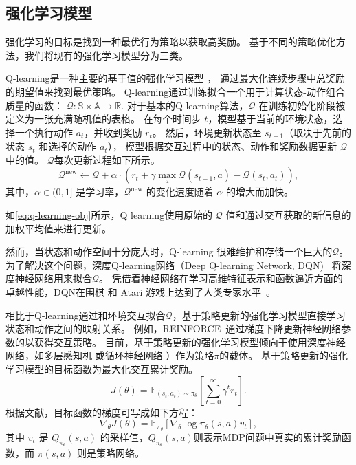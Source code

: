\subsection{强化学习模型}
\label{sec:Deep Reinforcement Learning model}
强化学习的目标是找到一种最优行为策略以获取高奖励。
基于不同的策略优化方法，我们将现有的强化学习模型分为三类。

Q-learning是一种主要的基于值的强化学习模型 \cite{watkins1989learning}，
通过最大化连续步骤中总奖励的期望值来找到最优策略。
Q-learning通过训练拟合一个用于计算状态-动作组合质量的函数：
$
\mathcal{Q}: \mathbb{S} \times \mathbb{A} \rightarrow \mathbb{R}.
$
对于基本的Q-learning算法，$\mathcal{Q}$ 在训练初始化阶段被定义为一张充满随机值的表格。
在每个时间步 $t$，模型基于当前的环境状态，选择一个执行动作 $a_t$，并收到奖励 $r_t$。
然后，环境更新状态至 $s_{t+1}$（取决于先前的状态 $s_t$ 和选择的动作 $a_t$），
模型根据交互过程中的状态、动作和奖励数据更新 $\mathcal{Q}$ 中的值。
$\mathcal{Q}$每次更新过程如下所示。
\begin{equation}
    \label{eq:q-learning-obj}
    \mathcal{Q}^{\text{new}} \leftarrow \mathcal{Q} + 
    \alpha \cdot\left(r_{t}+\gamma \max_{a} \mathcal{Q}\left(s_{t+1}, a\right)-\mathcal{Q}\left(s_{t}, a_{t}\right)\right), 
\end{equation}
其中，$\alpha \in (0,1]$ 是学习率，$\mathcal{Q}^{\text{new}}$ 的变化速度随着 $\alpha$ 的增大而加快。

如\autoref{eq:q-learning-obj}所示，Q learning使用原始的 $\mathcal{Q}$ 值和通过交互获取的新信息的加权平均值来进行更新。

然而，当状态和动作空间十分庞大时，Q-learning 很难维护和存储一个巨大的$\mathcal{Q}$。
为了解决这个问题，深度Q-learning网络（Deep Q-learning Network, DQN)~\cite{MKSGAWR13} 将深度神经网络用来拟合$\mathcal{Q}$。
凭借着神经网络在学习高维特征表示和函数逼近方面的卓越性能，DQN在围棋 \cite{SSSAHGHBLB17} 和 Atari 游戏上达到了人类专家水平~\cite{MKSGAWR13}。

相比于Q-learning通过和环境交互拟合$\mathcal{Q}$，基于策略更新的强化学习模型直接学习状态和动作之间的映射关系。
例如，REINFORCE~\cite{W92}通过梯度下降更新神经网络参数的以获得交互策略。
目前，基于策略更新的强化学习模型倾向于使用深度神经网络，如多层感知机 \cite{XLZP18} 或循环神经网络 \cite{ZMFLA16}）作为策略$\pi$的载体。
基于策略更新的强化学习模型的目标函数为最大化交互累计奖励。
\begin{equation}
    \label{eq:pg-obj}
    J(\theta)=\mathbb{E}_{\left(s_{t}, a_{t}\right) \sim \pi_{\theta}}\left[\sum_{t=0}^{\infty} \gamma^{t} r_{t}\right]. 
\end{equation}
根据文献{\rm\parencite{KT99}}，目标函数的梯度可写成如下方程：
\begin{equation}
    \nabla_{\theta} J(\theta)=\mathbb{E}_{\pi_{\theta}}\left[\nabla_{\theta} \log \pi_{\theta}(s, a) v_t\right], 
\end{equation}
其中 $v_t$ 是 $Q_{\pi_{\theta}}(s,a)$ 的采样值，$Q_{\pi_{\theta}}(s,a)$则表示MDP问题中真实的累计奖励函数，而 $\pi\left(s, a\right)$ 则是策略网络。

